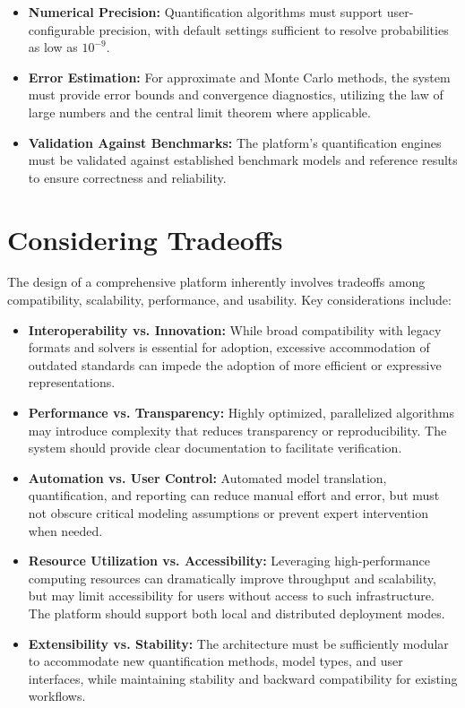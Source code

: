 \begin{itemize}
    \item \textbf{Numerical Precision:} Quantification algorithms must support user-configurable precision, with default settings sufficient to resolve probabilities as low as $10^{-9}$.
    \item \textbf{Error Estimation:} For approximate and Monte Carlo methods, the system must provide error bounds and convergence diagnostics, utilizing the law of large numbers and the central limit theorem where applicable.
    \item \textbf{Validation Against Benchmarks:} The platform's quantification engines must be validated against established benchmark models and reference results to ensure correctness and reliability.
\end{itemize}

\section{Considering Tradeoffs}
\label{sec:tradeoffs}

The design of a comprehensive platform inherently involves tradeoffs among compatibility, scalability, performance, and usability. Key considerations include:

\begin{itemize}
    \item \textbf{Interoperability vs. Innovation:} While broad compatibility with legacy formats and solvers is essential for adoption, excessive accommodation of outdated standards can impede the adoption of more efficient or expressive representations.
    \item \textbf{Performance vs. Transparency:} Highly optimized, parallelized algorithms may introduce complexity that reduces transparency or reproducibility. The system should provide clear documentation to facilitate verification.
    \item \textbf{Automation vs. User Control:} Automated model translation, quantification, and reporting can reduce manual effort and error, but must not obscure critical modeling assumptions or prevent expert intervention when needed.
    \item \textbf{Resource Utilization vs. Accessibility:} Leveraging high-performance computing resources can dramatically improve throughput and scalability, but may limit accessibility for users without access to such infrastructure. The platform should support both local and distributed deployment modes.
    \item \textbf{Extensibility vs. Stability:} The architecture must be sufficiently modular to accommodate new quantification methods, model types, and user interfaces, while maintaining stability and backward compatibility for existing workflows.
\end{itemize}
